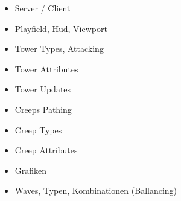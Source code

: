 \begin{itemize}
	\item Server / Client
	\item Playfield, Hud, Viewport
	\item Tower Types, Attacking
	\item Tower Attributes
	\item Tower Updates
	\item Creeps Pathing
	\item Creep Types
	\item Creep Attributes
	\item Grafiken
	\item Waves, Typen, Kombinationen (Ballancing)
\end{itemize}
